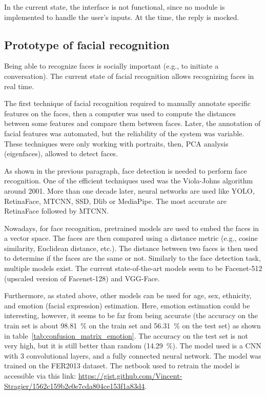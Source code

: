 \documentclass[sigconf]{acmart}
\begin{document}
In the current state, the interface is not functional, since no module is implemented to handle the user's inputs. At the time, the reply is mocked.

\subsection{Prototype of facial recognition}

Being able to recognize faces is socially important (e.g., to initiate a conversation). The current state of facial recognition allows recognizing faces in real time.

The first technique of facial recognition required to manually annotate specific features on the faces, then a computer was used to compute the distances between some features and compare them between faces\cite{virgilpetrescuFaceRecognitionBiometric2019}. Later, the annotation of facial features was automated, but the reliability of the system was variable\cite{kanadeComputerRecognitionHuman1977}. These techniques were only working with portraits, then, PCA analysis (eigenfaces)\cite{pentlandFaceRecognitionUsing}, allowed to detect faces.

As shown in the previous paragraph, face detection is needed to perform face recognition. One of the efficient techniques used was the Viola-Johns algorithm\cite{violaRobustRealTimeFace2004} around 2001. More than one decade later, neural networks are used like YOLO\cite{yangRealtimeFaceDetection2018}, RetinaFace\cite{dengRetinaFaceSinglestageDense2019}, MTCNN\cite{kaziakhmedovRealworldAttackMTCNN2019}, SSD\cite{liuSSDSingleShot2016}, Dlib\cite{sharmaFARECCNNBased2016} or MediaPipe\cite{serengilDeepFaceDetection2022}. The most accurate are RetinaFace followed by MTCNN\cite{serengilDeepface2023a}.

Nowadays, for face recognition, pretrained models are used to embed the faces in a vector space. The faces are then compared using a distance metric (e.g., cosine similarity, Euclidean distance, etc.). The distance between two faces is then used to determine if the faces are the same or not. Similarly to the face detection task, multiple models exist. The current state-of-the-art models seem to be Facenet-512 (upscaled version of Facenet-128\cite{schroffFaceNetUnifiedEmbedding2015}) and VGG-Face\cite{parkhiDeepFaceRecognition2015}.

Furthermore, as stated above, other models can be used for age, sex, ethnicity, and emotion (facial expression) estimation. Here, emotion estimation could be interesting, however, it seems to be far from being accurate (the accuracy on the train set is about 98.81 \% on the train set and 56.31 \% on the test set) as shown in table~\ref{tab:confusion_matrix_emotion}. The accuracy on the test set is not very high, but it is still better than random (14.29 \%). The model used is a CNN with 3 convolutional layers, and a fully connected neural network. The model was trained on the FER2013 dataset\cite{serengilFacialExpressionRecognition2018}. The netbook used to retrain the model is accessible via this link: \url{https://gist.github.com/Vincent-Stragier/1562c159b2e0e7cda804ce153f1a83d4}.
\end{document}
